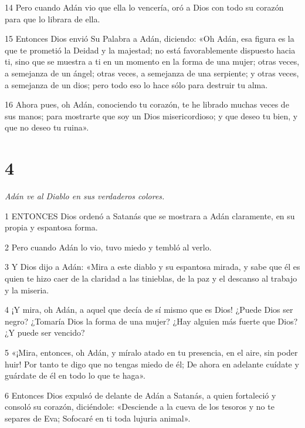 \par 14 Pero cuando Adán vio que ella lo vencería, oró a Dios con todo su corazón para que lo librara de ella.

\par 15 Entonces Dios envió Su Palabra a Adán, diciendo: «Oh Adán, esa figura es la que te prometió la Deidad y la majestad; no está favorablemente dispuesto hacia ti, sino que se muestra a ti en un momento en la forma de una mujer; otras veces, a semejanza de un ángel; otras veces, a semejanza de una serpiente; y otras veces, a semejanza de un dios; pero todo eso lo hace sólo para destruir tu alma.

\par 16 Ahora pues, oh Adán, conociendo tu corazón, te he librado muchas veces de sus manos; para mostrarte que soy un Dios misericordioso; y que deseo tu bien, y que no deseo tu ruina».

\chapter{4}

\par \textit{Adán ve al Diablo en sus verdaderos colores.}

\par 1 ENTONCES Dios ordenó a Satanás que se mostrara a Adán claramente, en su propia y espantosa forma.

\par 2 Pero cuando Adán lo vio, tuvo miedo y tembló al verlo.

\par 3 Y Dios dijo a Adán: «Mira a este diablo y su espantosa mirada, y sabe que él es quien te hizo caer de la claridad a las tinieblas, de la paz y el descanso al trabajo y la miseria.

\par 4 ¡Y mira, oh Adán, a aquel que decía de sí mismo que es Dios! ¿Puede Dios ser negro? ¿Tomaría Dios la forma de una mujer? ¿Hay alguien más fuerte que Dios? ¿Y puede ser vencido?

\par 5 «¡Mira, entonces, oh Adán, y míralo atado en tu presencia, en el aire, sin poder huir! Por tanto te digo que no tengas miedo de él; De ahora en adelante cuídate y guárdate de él en todo lo que te haga».

\par 6 Entonces Dios expulsó de delante de Adán a Satanás, a quien fortaleció y consoló su corazón, diciéndole: «Desciende a la cueva de los tesoros y no te separes de Eva; Sofocaré en ti toda lujuria animal».

